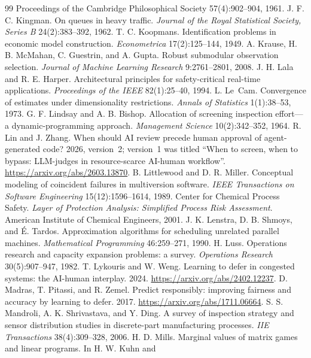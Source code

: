 \documentclass[11pt]{article}
\theoremstyle{definition}
\theoremstyle{remark}
\begin{document}
\begin{thebibliography}{99}
{Proceedings of the Cambridge Philosophical Society} 57(4):902--904, 1961.
 J. F. C. Kingman. On queues in heavy traffic. \emph{Journal of the Royal
Statistical Society, Series B} 24(2):383--392, 1962.
 T. C. Koopmans. Identification problems in economic model construction.
\emph{Econometrica} 17(2):125--144, 1949.
 A. Krause, H. B. McMahan, C. Guestrin, and A. Gupta. Robust submodular observation
selection. \emph{Journal of Machine Learning Research} 9:2761--2801, 2008.
 J. H. Lala and R. E. Harper. Architectural principles for safety-critical real-time
applications. \emph{Proceedings of the IEEE} 82(1):25--40, 1994.
 L. Le~Cam. Convergence of estimates under dimensionality restrictions. \emph{Annals
of Statistics} 1(1):38--53, 1973.
 G. F. Lindsay and A. B. Bishop. Allocation of screening inspection effort---a
dynamic-programming approach. \emph{Management Science} 10(2):342--352, 1964.
 R. Lin and J. Zhang. When should AI review precede human approval of
agent-generated code? 2026, version~2; version~1 was titled ``When to screen, when to bypass:
LLM-judges in resource-scarce AI-human workflow''. \url{https://arxiv.org/abs/2603.13870}.
 B. Littlewood and D. R. Miller. Conceptual modeling of coincident failures in
multiversion software. \emph{IEEE Transactions on Software Engineering} 15(12):1596--1614, 1989.
 Center for Chemical Process Safety. \emph{Layer of Protection Analysis: Simplified
Process Risk Assessment}. American Institute of Chemical Engineers, 2001.
 J. K. Lenstra, D. B. Shmoys, and \'E. Tardos. Approximation algorithms for scheduling
unrelated parallel machines. \emph{Mathematical Programming} 46:259--271, 1990.
 H. Luss. Operations research and capacity expansion problems: a survey.
\emph{Operations Research} 30(5):907--947, 1982.
 T. Lykouris and W. Weng. Learning to defer in congested systems: the AI-human
interplay. 2024. \url{https://arxiv.org/abs/2402.12237}.
 D. Madras, T. Pitassi, and R. Zemel. Predict responsibly: improving fairness and
accuracy by learning to defer. 2017. \url{https://arxiv.org/abs/1711.06664}.
 S. S. Mandroli, A. K. Shrivastava, and Y. Ding. A survey of inspection strategy
and sensor distribution studies in discrete-part manufacturing processes. \emph{IIE Transactions}
38(4):309--328, 2006.
 H. D. Mills. Marginal values of matrix games and linear programs. In H. W. Kuhn and

\end{thebibliography}
\end{document}
